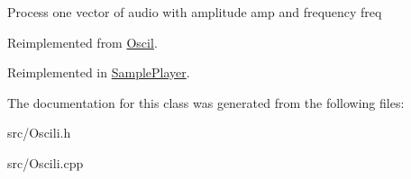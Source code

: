 Process one vector of audio with amplitude amp and frequency freq 

Reimplemented from \hyperlink{class_oscil_abca4352d264fd66538502c72c2440784}{Oscil}.



Reimplemented in \hyperlink{class_sample_player_a01fc7c2fdfd29c0c178e288d5aa06acc}{Sample\+Player}.



The documentation for this class was generated from the following files\+:\begin{DoxyCompactItemize}
\item 
src/Oscili.\+h\item 
src/Oscili.\+cpp\end{DoxyCompactItemize}
